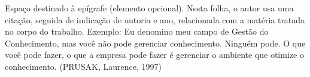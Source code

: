 \begin{epigrafe}
    \vspace*{\fill}
    \hspace{.5\textwidth} %
    \begin{minipage}{.47\textwidth}
        \SingleSpacing %
        \raggedleft %
        \sloppy %
        
        Espaço destinado à epígrafe
        (elemento opcional). Nesta folha, o autor
        usa uma citação, seguida de indicação de
        autoria e ano, relacionada com a matéria
        tratada no corpo do trabalho.
        Exemplo:
        Eu denomino meu campo de Gestão do Conhecimento,
        mas você não pode gerenciar
        conhecimento. Ninguém pode. O que
        você pode fazer, o que a empresa pode
        fazer é gerenciar o ambiente que
        otimize o conhecimento. (PRUSAK,
        Laurence, 1997)
    \end{minipage}
\end{epigrafe}